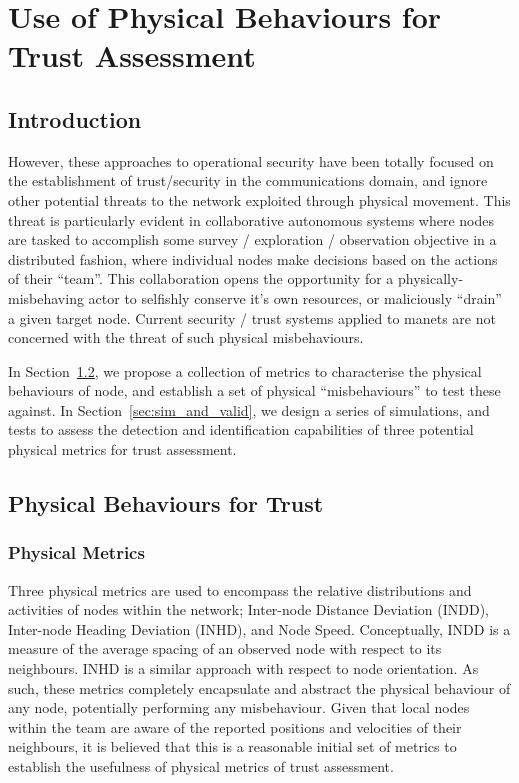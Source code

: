 \chapter{Use of Physical Behaviours for Trust Assessment} \label{ch:physical_trust}

\section{Introduction}


However, these approaches to operational security have been totally focused on the establishment of trust/security in the communications domain, and ignore other potential threats to the network exploited through physical movement.
This threat is particularly evident in collaborative autonomous systems where nodes are tasked to accomplish some survey / exploration / observation objective in a distributed fashion, where individual nodes make decisions based on the actions of their ``team''. 
This collaboration opens the opportunity for a physically-misbehaving actor to selfishly conserve it's own resources, or maliciously ``drain'' a given target node.
Current security / trust systems applied to \glspl{manet} are not concerned with the threat of such physical misbehaviours.

In Section~\ref{sec:physbev}, we propose a collection of metrics to characterise the physical behaviours of node, and establish a set of physical ``misbehaviours'' to test these against.
In Section~\ref{sec:sim_and_valid}, we design a series of simulations, and tests to assess the detection and identification capabilities of three potential physical metrics for trust assessment.

\section{Physical Behaviours for Trust}\label{sec:physbev}

\subsection{Physical Metrics}

Three physical metrics are used to encompass the relative distributions and activities of nodes within the network; Inter-node Distance Deviation (INDD), Inter-node Heading Deviation (INHD), and Node Speed. 
Conceptually, INDD is a measure of the average spacing of an observed node with respect to its neighbours. 
INHD is a similar approach with respect to node orientation.
As such, these metrics completely encapsulate and abstract the physical behaviour of any node, potentially performing any misbehaviour.
Given that local nodes within the team are aware of the reported positions and velocities of their neighbours, it is believed that this is a reasonable initial set of metrics to establish the usefulness of physical metrics of trust assessment.

